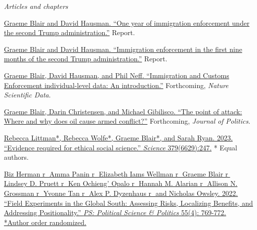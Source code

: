 \documentclass[10.9pt]{article}
\makeatletter
\newcommand\donotbreakhere{\par\nobreak\@afterheading\vspace{1em}}
\newcommand{\complete}{1}
\makeatother
\begin{document}
{\large\it \hspace{.15em} Articles and chapters}\donotbreakhere
\begin{etaremune}
\item \href{https://deportationdata.org/analysis/immigration-enforcement-first-year.html}{Graeme Blair and David Hausman. ``One year of immigration enforcement under the second Trump administration.''} Report.
\item \href{https://deportationdata.org/analysis/immigration-enforcement-first-nine-months-trump.html}{Graeme Blair and David Hausman. ``Immigration enforcement in the first nine months of the second Trump administration.''} Report.
\item \href{https://graemeblair.com/papers/ice-data-preprint.pdf}{Graeme Blair, David Hausman, and Phil Neff. ``Immigration and Customs Enforcement individual-level data: An introduction.''} Forthcoming, \textit{Nature Scientific Data}. 
\item \href{https://graemeblair.com/papers/where.pdf}{Graeme Blair, Darin Christensen, and Michael Gibilisco. ``The point of attack: Where and why does oil cause armed conflict?''} Forthcoming, \textit{Journal of Politics}.
\item \href{https://www.science.org/doi/10.1126/science.adf8329}{Rebecca Littman*, Rebecca Wolfe*, Graeme Blair*, and Sarah Ryan. 2023. ``Evidence required for ethical social science.'' {\it Science} 379(6629):247.} * Equal authors.
\item \href{https://graemeblair.com/papers/fieldexp.pdf}{Biz Herman \textcircled{r} Amma Panin \textcircled{r} Elizabeth Iams Wellman \textcircled{r} Graeme Blair \textcircled{r} Lindsey D. Pruett \textcircled{r} Ken Ochieng' Opalo \textcircled{r} Hannah M. Alarian \textcircled{r} Allison N. Grossman \textcircled{r} Yvonne Tan \textcircled{r} Alex P. Dyzenhaus \textcircled{r} and Nicholas Owsley. 2022. ``Field Experiments in the Global South: Assessing Risks, Localizing Benefits, and Addressing Positionality.'' {\it PS: Political Science \& Politics} 55(4): 769-772. *Author order randomized.}

\end{etaremune}
\end{document}
